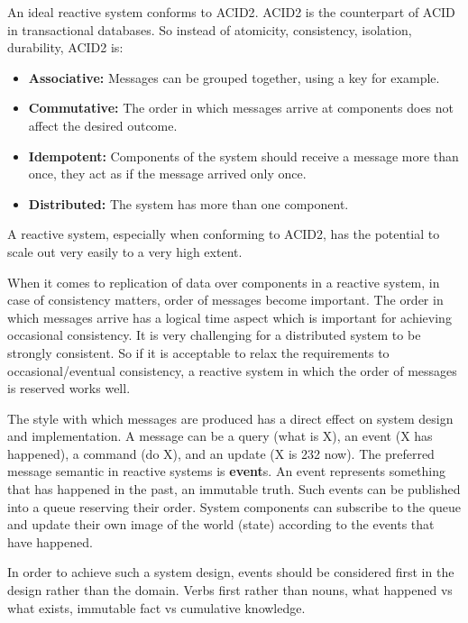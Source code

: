 \documentclass[a4]{report}
\begin{document}
    An ideal reactive system conforms to ACID2\cite{reactive-microsystems}.
    ACID2 is the counterpart of ACID in transactional databases.
    So instead of atomicity, consistency, isolation, durability, ACID2 is:
    \begin{itemize}
        \item \textbf{Associative:} Messages can be grouped together, using a key for example.
        \item \textbf{Commutative:} The order in which messages arrive at components does not affect the desired outcome.
        \item \textbf{Idempotent:} Components of the system should receive a message more than once, they act as if the message arrived only once.
        \item \textbf{Distributed:} The system has more than one component.
    \end{itemize}

    A reactive system, especially when conforming to ACID2, has the potential to scale out very easily to a very high extent.

    When it comes to replication of data over components in a reactive system, in case of consistency matters, order of
    messages become important.
    The order in which messages arrive has a logical time aspect which is important for achieving occasional consistency.
    It is very challenging for a distributed system to be strongly consistent.
    So if it is acceptable to relax the requirements to occasional/eventual consistency, a reactive system in which the order of messages is reserved works well.

    The style with which messages are produced has a direct effect on system design and implementation.
    A message can be a query (what is X), an event (X has happened), a command (do X), and an update (X is 232 now).
    The preferred message semantic in reactive systems is \textbf{event}s.
    An event represents something that has happened in the past, an immutable truth.
    Such events can be published into a queue reserving their order.
    System components can subscribe to the queue and update their own image of the world (state) according to the events that have happened.

    In order to achieve such a system design, events should be considered first in the design rather than the domain.
    Verbs first rather than nouns, what happened vs what exists, immutable fact vs cumulative knowledge.
\end{document}
